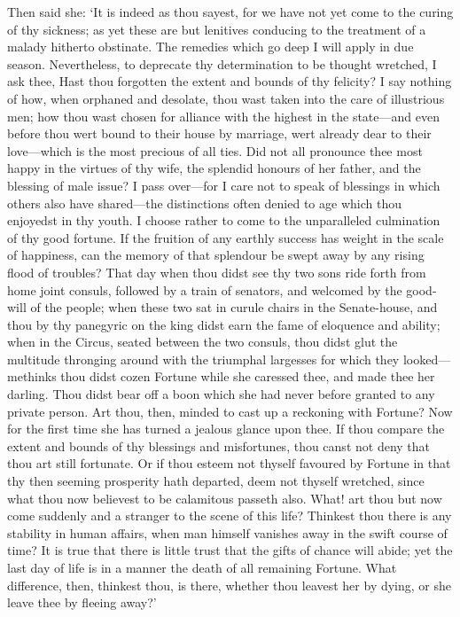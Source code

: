 \documentclass[11pt]{book}
\begin{document}
Then said she: `It is indeed as thou sayest, for we have not yet come to
the curing of thy sickness; as yet these are but lenitives conducing to
the treatment of a malady hitherto obstinate. The remedies which go deep
I will apply in due season. Nevertheless, to deprecate thy
determination to be thought wretched, I ask thee, Hast thou forgotten
the extent and bounds of thy felicity? I say nothing of how, when
orphaned and desolate, thou wast taken into the care of illustrious men;
how thou wast chosen for alliance with the highest in the state---and
even before thou wert bound to their house by marriage, wert already
dear to their love---which is the most precious of all ties. Did not all
pronounce thee most happy in the virtues of thy wife, the splendid
honours of her father, and the blessing of male issue? I pass over---for
I care not to speak of blessings in which others also have shared---the
distinctions often denied to age which thou enjoyedst in thy youth. I
choose rather to come to the unparalleled culmination of thy good
fortune. If the fruition of any earthly success has weight in the scale
of happiness, can the memory of that splendour be swept away by any
rising flood of troubles? That day when thou didst see thy two sons ride
forth from home joint consuls, followed by a train of senators, and
welcomed by the good-will of the people; when these two sat in curule
chairs in the Senate-house, and thou by thy panegyric on the king didst
earn the fame of eloquence and ability; when in the Circus, seated
between the two consuls, thou didst glut the multitude thronging around
with the triumphal largesses for which they looked---methinks thou didst
cozen Fortune while she caressed thee, and made thee her darling. Thou
didst bear off a boon which she had never before granted to any private
person. Art thou, then, minded to cast up a reckoning with Fortune? Now
for the first time she has turned a jealous glance upon thee. If thou
compare the extent and bounds of thy blessings and misfortunes, thou
canst not deny that thou art still fortunate. Or if thou esteem not
thyself favoured by Fortune in that thy then seeming prosperity hath
departed, deem not thyself wretched, since what thou now believest to be
calamitous passeth also. What! art thou but now come suddenly and a
stranger to the scene of this life? Thinkest thou there is any stability
in human affairs, when man himself vanishes away in the swift course of
time? It is true that there is little trust that the gifts of chance
will abide; yet the last day of life is in a manner the death of all
remaining Fortune. What difference, then, thinkest thou, is there,
whether thou leavest her by dying, or she leave thee by fleeing away?'
\end{document}
